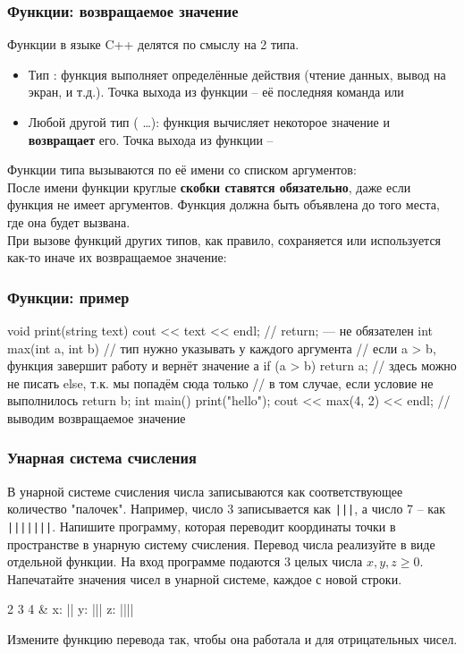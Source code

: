 \begin{frame}
	\frametitle{Функции: возвращаемое значение}
	Функции в языке C++ делятся по смыслу на 2 типа.
	\begin{itemize}
		\item Тип : функция выполняет определённые действия (чтение
			данных, вывод на экран, и т.д.). Точка выхода из функции -- её последняя
			команда или 
		\item Любой другой тип ( \dots): функция вычисляет
			некоторое значение и {\bf возвращает} его. Точка выхода из функции --
	\end{itemize}
	Функции типа  вызываются по её имени со списком аргументов:
	\\
	После имени функции круглые {\bf скобки ставятся обязательно}, даже если
	функция не имеет аргументов. Функция должна быть объявлена до того места, где
	она будет вызвана. \\

	При вызове функций других типов, как правило, сохраняется или используется
	как-то иначе их возвращаемое значение: \\
\end{frame}

\begin{frame}[fragile]
	\frametitle{Функции: пример}
	\begin{code}
void print(string text)
{
	cout << text << endl;
	// return; — не обязателен
}
int max(int a, int b) // тип нужно указывать у каждого аргумента
{
	// если a > b, функция завершит работу и вернёт значение а
	if (a > b) return a;
	// здесь можно не писать else, т.к. мы попадём сюда только
	// в том случае, если условие не выполнилось
	return b;
}
int main()
{
	print("hello");
	cout << max(4, 2) << endl; // выводим возвращаемое значение
}
	\end{code}
\end{frame}

\begin{frame}
	\frametitle{Унарная система счисления}
В унарной системе счисления числа записываются как соответствующее
	количество "палочек". Например, число 3 записывается как {\tt |||}, а число 7 – как
	{\tt |||||||}. Напишите программу, которая переводит координаты точки в пространстве
	в унарную систему счисления. Перевод числа реализуйте в виде отдельной
	функции.
	\inp
	На вход программе подаются 3 целых числа $x, y, z \geq 0$.
	\out
	Напечатайте значения чисел в унарной системе, каждое с новой строки.
	\begin{ex}
		2 3 4 & x: || \newline y: ||| \newline z: |||| \tb
	\end{ex}
	{\bf *}Измените функцию перевода так, чтобы она работала и для отрицательных
	чисел.
\end{frame}

